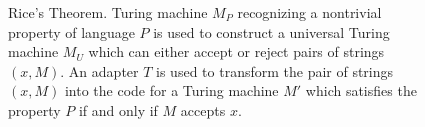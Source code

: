 \begin{figure}
\centering



\caption{Rice's Theorem. Turing machine $M_P$ recognizing
  a nontrivial property of language $P$ is used to construct
  a universal Turing machine $M_U$ which can either accept or
  reject pairs of strings $\left(x, M\right)$. An adapter $T$ is used
  to transform the pair of strings $\left(x, M\right)$ into the code
  for a Turing machine $M'$ which satisfies the property $P$ if and
  only if $M$ accepts $x$.
} 
\label{figAddAlgoRiceTheorem}
\end{figure}